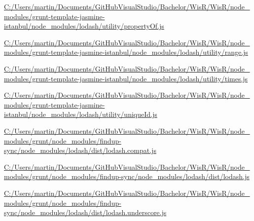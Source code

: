\begin{DoxyCompactItemize}
\item 
\hyperlink{_c_1_2_users_2martin_2_documents_2_git_hub_visual_studio_2_bachelor_2_wis_r_2_wis_r_2node_modulec35bbe6b9c501c671ba9dea48dad808e}{C\+:/\+Users/martin/\+Documents/\+Git\+Hub\+Visual\+Studio/\+Bachelor/\+Wis\+R/\+Wis\+R/node\+\_\+modules/grunt-\/template-\/jasmine-\/istanbul/node\+\_\+modules/lodash/utility/property\+Of.\+js}
\item 
\hyperlink{_c_1_2_users_2martin_2_documents_2_git_hub_visual_studio_2_bachelor_2_wis_r_2_wis_r_2node_module293574b757bfc04319911d22b9d7889f}{C\+:/\+Users/martin/\+Documents/\+Git\+Hub\+Visual\+Studio/\+Bachelor/\+Wis\+R/\+Wis\+R/node\+\_\+modules/grunt-\/template-\/jasmine-\/istanbul/node\+\_\+modules/lodash/utility/range.\+js}
\item 
\hyperlink{_c_1_2_users_2martin_2_documents_2_git_hub_visual_studio_2_bachelor_2_wis_r_2_wis_r_2node_module2614c0e1e1de510d2ffcd116d6581331}{C\+:/\+Users/martin/\+Documents/\+Git\+Hub\+Visual\+Studio/\+Bachelor/\+Wis\+R/\+Wis\+R/node\+\_\+modules/grunt-\/template-\/jasmine-\/istanbul/node\+\_\+modules/lodash/utility/times.\+js}
\item 
\hyperlink{_c_1_2_users_2martin_2_documents_2_git_hub_visual_studio_2_bachelor_2_wis_r_2_wis_r_2node_module62941a02f56a8cf500f667d4a5cc50d7}{C\+:/\+Users/martin/\+Documents/\+Git\+Hub\+Visual\+Studio/\+Bachelor/\+Wis\+R/\+Wis\+R/node\+\_\+modules/grunt-\/template-\/jasmine-\/istanbul/node\+\_\+modules/lodash/utility/unique\+Id.\+js}
\item 
\hyperlink{_c_1_2_users_2martin_2_documents_2_git_hub_visual_studio_2_bachelor_2_wis_r_2_wis_r_2node_module48aadbf56c839680452759eb0808e611}{C\+:/\+Users/martin/\+Documents/\+Git\+Hub\+Visual\+Studio/\+Bachelor/\+Wis\+R/\+Wis\+R/node\+\_\+modules/grunt/node\+\_\+modules/findup-\/sync/node\+\_\+modules/lodash/dist/lodash.\+compat.\+js}
\item 
\hyperlink{_c_1_2_users_2martin_2_documents_2_git_hub_visual_studio_2_bachelor_2_wis_r_2_wis_r_2node_modulec1c1ceea3bc761d16d3a7f2f7b908ed6}{C\+:/\+Users/martin/\+Documents/\+Git\+Hub\+Visual\+Studio/\+Bachelor/\+Wis\+R/\+Wis\+R/node\+\_\+modules/grunt/node\+\_\+modules/findup-\/sync/node\+\_\+modules/lodash/dist/lodash.\+js}
\item 
\hyperlink{_c_1_2_users_2martin_2_documents_2_git_hub_visual_studio_2_bachelor_2_wis_r_2_wis_r_2node_modulec178e91b2f078ea23874f1bf402258fc}{C\+:/\+Users/martin/\+Documents/\+Git\+Hub\+Visual\+Studio/\+Bachelor/\+Wis\+R/\+Wis\+R/node\+\_\+modules/grunt/node\+\_\+modules/findup-\/sync/node\+\_\+modules/lodash/dist/lodash.\+underscore.\+js}

\end{DoxyCompactItemize}
